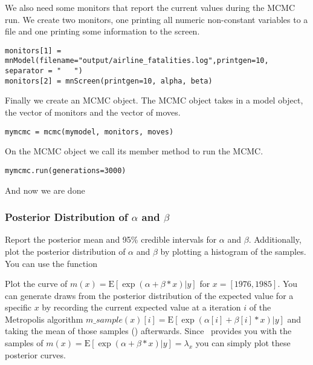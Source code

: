 We also need some monitors that report the current values during the MCMC run.
We create two monitors, one printing all numeric non-constant variables to a file and one printing some information to the screen.
{\tt \begin{snugshade*}
\begin{lstlisting} 
monitors[1] = mnModel(filename="output/airline_fatalities.log",printgen=10, separator = "	")
monitors[2] = mnScreen(printgen=10, alpha, beta)
\end{lstlisting}
\end{snugshade*}}
Finally we create an MCMC object.
The MCMC object takes in a model object, the vector of monitors and the vector of moves.
{\tt \begin{snugshade*}
\begin{lstlisting} 
mymcmc = mcmc(mymodel, monitors, moves)
\end{lstlisting}
\end{snugshade*}}
On the MCMC object we call its member method  to run the MCMC.
{\tt \begin{snugshade*}
\begin{lstlisting} 
mymcmc.run(generations=3000)
\end{lstlisting}
\end{snugshade*}}
And now we are done {\LARGE \smiley}


\subsubsection{Posterior Distribution of $\alpha$ and $\beta$}
 
Report the posterior mean and 95\% credible intervals for $\alpha$ and $\beta$. 
Additionally, plot the posterior distribution of $\alpha$ and $\beta$ by plotting a histogram of the samples. 
You can use the \R function

Plot the curve of $m(x) = \text{E}[\exp(\alpha+\beta*x)|y]$ for $x = [1976,1985]$. 
You can generate draws from the posterior distribution of the expected value for a specific $x$ by recording the current expected value at a iteration $i$ of the Metropolis algorithm $m\_sample(x)[i] = \text{E}[\exp(\alpha[i]+\beta[i]*x)|y]$ and taking the mean of those samples () afterwards. Since \RevBayes~provides you with the samples of $m(x) = \text{E}[\exp(\alpha+\beta*x)|y] = \lambda_x$ you can simply plot these posterior curves.
 
